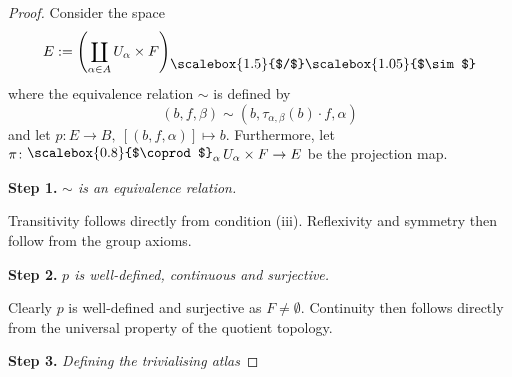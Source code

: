      \begin{proof}
        Consider the space
        \[
        E := \left( \coprod_{\alpha \in A} U_\alpha \times F \right)_{\raisebox{5pt}{\scalebox{1.5}{$/$}}\raisebox{5pt}{\scalebox{1.05}{$\sim$}}}
        \]
        where the equivalence relation $\sim$ is defined by
        \[
        (b,f,\beta) \sim (b,\tau_{\alpha,\beta}(b) \cdot f,\alpha)
        \]
        and let $p \colon E \to B, \: [(b,f,\alpha)] \mapsto b$. Furthermore, let $\pi \colon \raisebox{1.2pt}{$\scalebox{0.8}{$\coprod$}_\alpha$} \, U_\alpha \times F \to E$ be the projection map.

        \textbf{Step 1.} \textit{$\sim$ is an equivalence relation.}

        Transitivity follows directly from condition (iii). Reflexivity and symmetry then follow from the group axioms.

        \textbf{Step 2.} \textit{$p$ is well-defined, continuous and surjective.}

        Clearly $p$ is well-defined and surjective as $F \neq \emptyset$. Continuity then follows directly from the universal property of the quotient topology.

        \textbf{Step 3.} \textit{Defining the trivialising atlas}


\end{proof}
